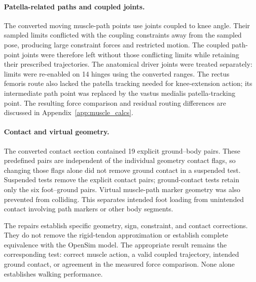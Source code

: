 \paragraph{Patella-related paths and coupled joints.}
The converted moving muscle-path points use joints coupled to knee angle. Their sampled limits conflicted with the coupling constraints away from the sampled pose, producing large constraint forces and restricted motion. The coupled path-point joints were therefore left without those conflicting limits while retaining their prescribed trajectories. The anatomical driver joints were treated separately: limits were re-enabled on 14 hinges using the converted ranges. The rectus femoris route also lacked the patella tracking needed for knee-extension action; its intermediate path point was replaced by the vastus medialis patella-tracking point. The resulting force comparison and residual routing differences are discussed in Appendix~\ref{app:muscle_calcs}.

\paragraph{Contact and virtual geometry.}
The converted contact section contained 19 explicit ground--body pairs. These predefined pairs are independent of the individual geometry contact flags, so changing those flags alone did not remove ground contact in a suspended test. Suspended tests remove the explicit contact pairs; ground-contact tests retain only the six foot--ground pairs. Virtual muscle-path marker geometry was also prevented from colliding. This separates intended foot loading from unintended contact involving path markers or other body segments.

The repairs establish specific geometry, sign, constraint, and contact corrections. They do not remove the rigid-tendon approximation or establish complete equivalence with the OpenSim model. The appropriate result remains the corresponding test: correct muscle action, a valid coupled trajectory, intended ground contact, or agreement in the measured force comparison. None alone establishes walking performance.

